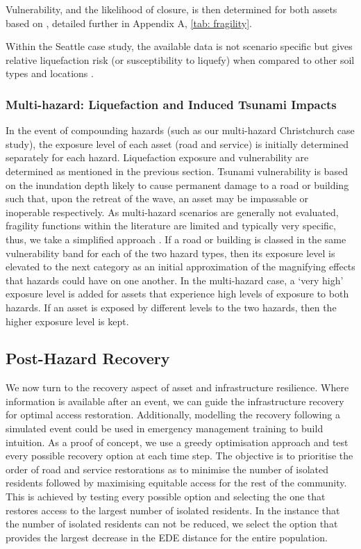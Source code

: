 \documentclass[review,3p,times,onecolumn,sort&compress,12pt]{elsarticle}
\let \cite \parencite
\begin{document}
Vulnerability, and the likelihood of closure, is then determined for both assets based on \cite{Wang_Chaofeng2021-jc, lin2018empirical}, detailed further in Appendix A, \autoref{tab: fragility}.

Within the Seattle case study, the available data is not scenario specific but gives relative liquefaction risk (or susceptibility to liquefy) when compared to other soil types and locations \cite{Seattle_Office_of_Emergency_Management2014-vt}.

\subsubsection{Multi-hazard: Liquefaction and Induced Tsunami Impacts}
In the event of compounding hazards (such as our multi-hazard Christchurch case study), the exposure level of each asset (road and service) is initially determined separately for each hazard. 
Liquefaction exposure and vulnerability are determined as mentioned in the previous section.
Tsunami vulnerability is based on the inundation depth likely to cause permanent damage to a road or building such that, upon the retreat of the wave, an asset may be impassable or inoperable respectively. 
As multi-hazard scenarios are generally not evaluated, fragility functions within the literature are limited and typically very specific, thus, we take a simplified approach \cite{Gehl_undated-rx}. 
If a road or building is classed in the same vulnerability band for each of the two hazard types, then its exposure level is elevated to the next category as an initial approximation of the magnifying effects that hazards could have on one another. 
In the multi-hazard case, a ‘very high’ exposure level is added for assets that experience high levels of exposure to both hazards. 
If an asset is exposed by different levels to the two hazards, then the higher exposure level is kept.

\subsection{Post-Hazard Recovery}
We now turn to the recovery aspect of asset and infrastructure resilience.
Where information is available after an event, we can guide the infrastructure recovery for optimal access restoration.
Additionally, modelling the recovery following a simulated event could be used in emergency management training to build intuition. 
As a proof of concept, we use a greedy optimisation approach and test every possible recovery option at each time step.
The objective is to prioritise the order of road and service restorations as to minimise the number of isolated residents followed by maximising equitable access for the rest of the community.
This is achieved by testing every possible option and selecting the one that restores access to the largest number of isolated residents.
In the instance that the number of isolated residents can not be reduced, we select the option that provides the largest decrease in the EDE distance for the entire population.
\end{document}
